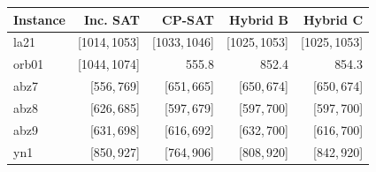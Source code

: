 \begin{tabular}{lrrrr}
\toprule
Instance & Inc. SAT & CP-SAT & Hybrid B & Hybrid C \\
\midrule
la21 & [1014,\,1053] & [1033,\,1046] & [1025,\,1053] & [1025,\,1053] \\
orb01 & [1044,\,1074] & 555.8 & 852.4 & 854.3 \\
abz7 & [556,\,769] & [651,\,665] & [650,\,674] & [650,\,674] \\
abz8 & [626,\,685] & [597,\,679] & [597,\,700] & [597,\,700] \\
abz9 & [631,\,698] & [616,\,692] & [632,\,700] & [616,\,700] \\
yn1 & [850,\,927] & [764,\,906] & [808,\,920] & [842,\,920] \\
\bottomrule
\end{tabular}

